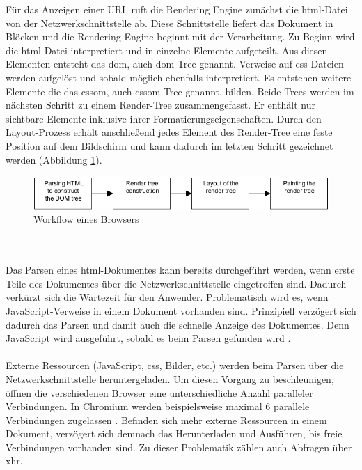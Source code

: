 Für das Anzeigen einer URL ruft die Rendering Engine zunächst die \gls{html}-Datei von der Netzwerkschnittstelle ab. Diese Schnittstelle liefert das Dokument in Blöcken und die Rendering-Engine beginnt mit der Verarbeitung. Zu Beginn wird die \gls{html}-Datei interpretiert und in einzelne Elemente aufgeteilt. Aus diesen Elementen entsteht das \gls{dom}, auch \gls{dom}-Tree genannt. Verweise auf \gls{css}-Dateien werden aufgelöst und sobald möglich ebenfalls interpretiert. Es entstehen weitere Elemente die das \gls{cssom}, auch \gls{cssom}-Tree genannt, bilden. Beide Trees werden im nächsten Schritt zu einem Render-Tree zusammengefasst. Er enthält nur sichtbare Elemente inklusive ihrer Formatierungseigenschaften. Durch den Layout-Prozess erhält anschließend jedes Element des Render-Tree eine feste Position auf dem Bildschirm und kann dadurch im letzten Schritt gezeichnet werden (Abbildung \ref{hbw-flow}).\cite{hbw}\cite{g-rendertree}
\begin{figure}[h]
	\centering
	\includegraphics[scale=0.8]{Bilder/Browser-Engine-Flow.png}
	\caption{Workflow eines Browsers \cite{hbw}}
	\label{hbw-flow}
\end{figure}
\\\\
Das Parsen eines \gls{html}-Dokumentes kann bereits durchgeführt werden, wenn erste Teile des Dokumentes über die Netzwerkschnittstelle eingetroffen sind. Dadurch verkürzt sich die Wartezeit für den Anwender\cite{hbw}. Problematisch wird es, wenn JavaScript-Verweise in einem Dokument vorhanden sind. Prinzipiell verzögert sich dadurch das Parsen und damit auch die schnelle Anzeige des Dokumentes. Denn JavaScript wird ausgeführt, sobald es beim Parsen gefunden wird \cite[S. 1]{Zakas2010}. 
\\\\ 
Externe Ressourcen (JavaScript, \gls{css}, Bilder, etc.) werden beim Parsen über die Netzwerkschnittstelle heruntergeladen. Um diesen Vorgang zu beschleunigen, öffnen die verschiedenen Browser eine unterschiedliche Anzahl paralleler Verbindungen. In Chromium werden beispielsweise maximal 6 parallele Verbindungen zugelassen \cite{ss-parallelconnections}. Befinden sich mehr externe Ressourcen in einem Dokument, verzögert sich demnach das Herunterladen und Ausführen, bis  freie Verbindungen vorhanden sind. Zu dieser Problematik zählen auch Abfragen über \gls{xhr}.

